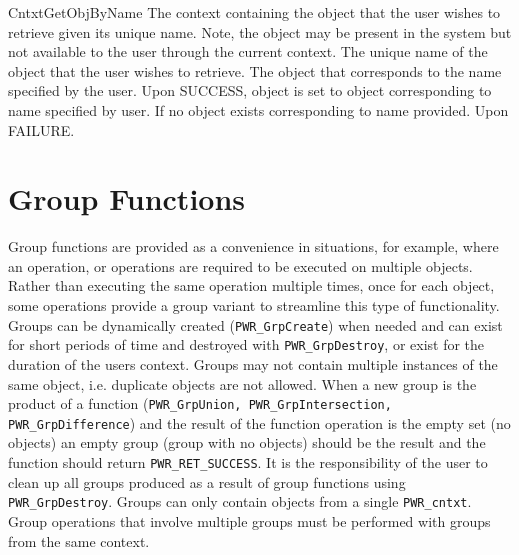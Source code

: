 \begin{prototype}{CntxtGetObjByName}
		{\pInput}{The context containing the object that the user wishes to retrieve given its unique name. Note, the object may be present in the system but not available to the user through the current context.}
		{\pInput}{The unique name of the object that the user wishes to retrieve.}
		{\pOutput}{The object that corresponds to the name specified by the user.}
	             	{Upon SUCCESS, object is set to object corresponding to name specified by user.}
	 	{If no object exists corresponding to name provided.}
	             	{Upon FAILURE.}
\end{prototype}

\section{Group Functions}\label{sec:Group}

Group functions are provided as a convenience in situations, for example, where an operation, or operations are required to be executed on multiple objects. 
Rather than executing the same operation multiple times, once for each object, some operations provide a group variant to streamline this type of functionality.
Groups can be dynamically created (\texttt{PWR_GrpCreate}) when needed and can exist for short periods of time and destroyed with \texttt{PWR_GrpDestroy}, or exist for the duration of the users context.
Groups may not contain multiple instances of the same object, i.e. duplicate objects are not allowed.
When a new group is the product of a function (\texttt{PWR_GrpUnion, PWR_GrpIntersection, PWR_GrpDifference}) and the result of the function operation is the empty set (no objects) an empty group (group with no objects)  should be the result and the function should return \texttt{PWR_RET_SUCCESS}. 
It is the responsibility of the user to clean up all groups produced as a result of group functions using \texttt{PWR_GrpDestroy}.
Groups can only contain objects from a single \texttt{PWR_cntxt}.
Group operations that involve multiple groups must be performed with groups from the same context.


